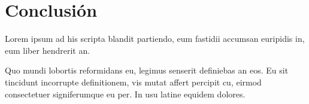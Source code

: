 \chapter[Conclusión]{Conclusión}\label{ch:capitulo5}
\fpar

\parindent=0pt Lorem ipsum ad his scripta blandit partiendo, eum fastidii accumsan euripidis in, eum liber hendrerit an. 

\vspace{0.5cm}
\parindent=30pt Quo mundi lobortis reformidans eu, legimus senserit definiebas an eos. Eu sit tincidunt incorrupte definitionem, vis mutat affert percipit cu, eirmod consectetuer signiferumque eu per. In usu latine equidem dolores.